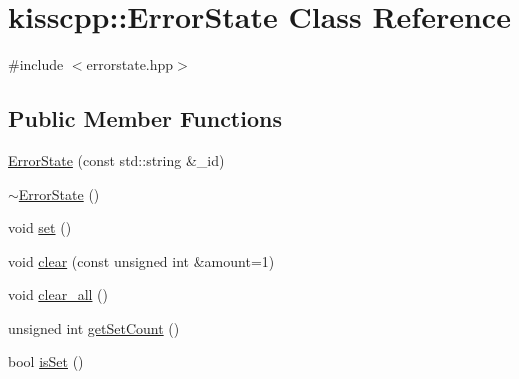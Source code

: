 \hypertarget{classkisscpp_1_1_error_state}{\section{kisscpp\-:\-:Error\-State Class Reference}
\label{classkisscpp_1_1_error_state}
}


{\ttfamily \#include $<$errorstate.\-hpp$>$}

\subsection*{Public Member Functions}
\begin{DoxyCompactItemize}
\item 
\hyperlink{classkisscpp_1_1_error_state_a0b9109ca4cb0c58114b7b0e32638f18c}{Error\-State} (const std\-::string \&\-\_\-id)
\item 
\hyperlink{classkisscpp_1_1_error_state_a75f55fa61878bb008abd861012b88662}{$\sim$\-Error\-State} ()
\item 
void \hyperlink{classkisscpp_1_1_error_state_adba9283ecd7976c57ef48d438da86778}{set} ()
\item 
void \hyperlink{classkisscpp_1_1_error_state_a2d6939dda90115b7f93a03595296e49b}{clear} (const unsigned int \&amount=1)
\item 
void \hyperlink{classkisscpp_1_1_error_state_aa9da790733f2f6963a5b6ca1167d137b}{clear\-\_\-all} ()
\item 
unsigned int \hyperlink{classkisscpp_1_1_error_state_a211a4d0740010a7aa7c78b8514bc6969}{get\-Set\-Count} ()
\item 
bool \hyperlink{classkisscpp_1_1_error_state_a79c9043eb6c04a10e7c4b86888697ce8}{is\-Set} ()
\end{DoxyCompactItemize}


